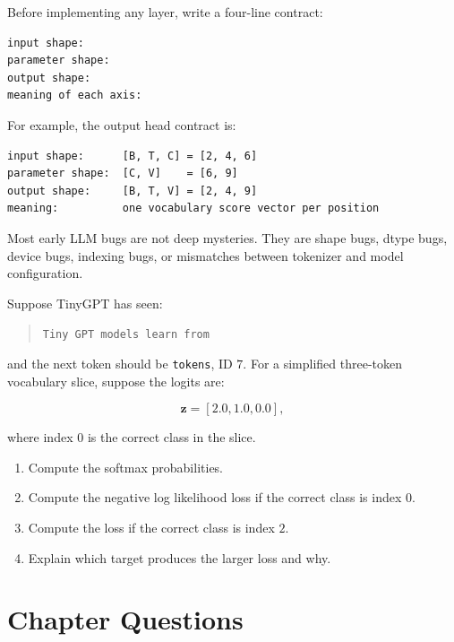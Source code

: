 \engineering

Before implementing any layer, write a four-line contract:

\begin{lstlisting}
input shape:
parameter shape:
output shape:
meaning of each axis:
\end{lstlisting}

For example, the output head contract is:

\begin{lstlisting}
input shape:      [B, T, C] = [2, 4, 6]
parameter shape:  [C, V]    = [6, 9]
output shape:     [B, T, V] = [2, 4, 9]
meaning:          one vocabulary score vector per position
\end{lstlisting}

Most early LLM bugs are not deep mysteries. They are shape bugs, dtype bugs, device bugs, indexing bugs, or mismatches between tokenizer and model configuration.


Suppose TinyGPT has seen:

\begin{quote}
\texttt{Tiny GPT models learn from}
\end{quote}

and the next token should be \texttt{tokens}, ID \(7\). For a simplified three-token vocabulary slice, suppose the logits are:

\[
\mathbf{z} = [2.0,1.0,0.0],
\]

where index \(0\) is the correct class in the slice.

\begin{enumerate}
  \item Compute the softmax probabilities.
  \item Compute the negative log likelihood loss if the correct class is index \(0\).
  \item Compute the loss if the correct class is index \(2\).
  \item Explain which target produces the larger loss and why.
\end{enumerate}

\section{Chapter Questions}

